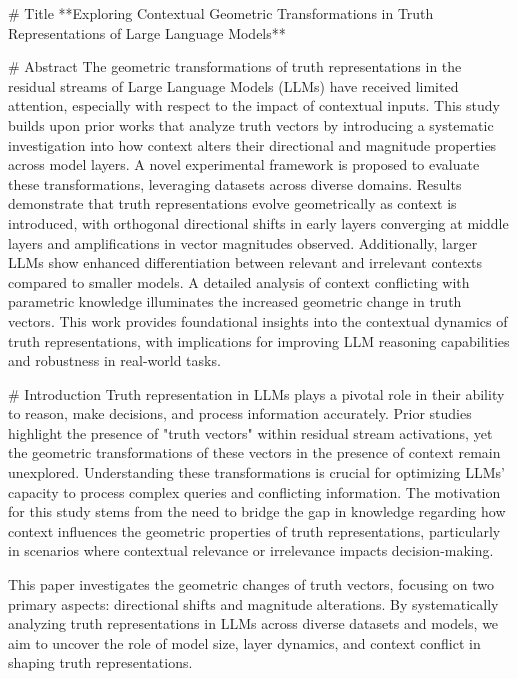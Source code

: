 # Title  
**Exploring Contextual Geometric Transformations in Truth Representations of Large Language Models**  

# Abstract  
The geometric transformations of truth representations in the residual streams of Large Language Models (LLMs) have received limited attention, especially with respect to the impact of contextual inputs. This study builds upon prior works that analyze truth vectors by introducing a systematic investigation into how context alters their directional and magnitude properties across model layers. A novel experimental framework is proposed to evaluate these transformations, leveraging datasets across diverse domains. Results demonstrate that truth representations evolve geometrically as context is introduced, with orthogonal directional shifts in early layers converging at middle layers and amplifications in vector magnitudes observed. Additionally, larger LLMs show enhanced differentiation between relevant and irrelevant contexts compared to smaller models. A detailed analysis of context conflicting with parametric knowledge illuminates the increased geometric change in truth vectors. This work provides foundational insights into the contextual dynamics of truth representations, with implications for improving LLM reasoning capabilities and robustness in real-world tasks.  

# Introduction  
Truth representation in LLMs plays a pivotal role in their ability to reason, make decisions, and process information accurately. Prior studies highlight the presence of "truth vectors" within residual stream activations, yet the geometric transformations of these vectors in the presence of context remain unexplored. Understanding these transformations is crucial for optimizing LLMs' capacity to process complex queries and conflicting information. The motivation for this study stems from the need to bridge the gap in knowledge regarding how context influences the geometric properties of truth representations, particularly in scenarios where contextual relevance or irrelevance impacts decision-making.  

This paper investigates the geometric changes of truth vectors, focusing on two primary aspects: directional shifts and magnitude alterations. By systematically analyzing truth representations in LLMs across diverse datasets and models, we aim to uncover the role of model size, layer dynamics, and context conflict in shaping truth representations.  

